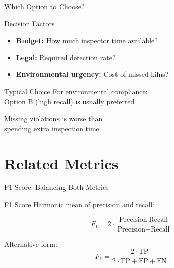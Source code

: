 \documentclass{beamer}
\begin{document}
\begin{frame}{Which Option to Choose?}
\begin{alertblock}{Decision Factors}
\small
\begin{itemize}
    \item \textbf{Budget:} How much inspector time available?
    \item \textbf{Legal:} Required detection rate?
    \item \textbf{Environmental urgency:} Cost of missed kilns?
\end{itemize}
\end{alertblock}

\vspace{0.15cm}

\begin{keypointsbox}{Typical Choice}
\small
For environmental compliance: \\
Option B (high recall) is usually preferred

\vspace{0.2cm}

Missing violations is worse than \\
spending extra inspection time
\end{keypointsbox}
\end{frame}

\section{Related Metrics}

\begin{frame}{F1 Score: Balancing Both Metrics}
\begin{definitionbox}{F1 Score}
\small
Harmonic mean of precision and recall:

$$F_1 = 2 \cdot \frac{\text{Precision} \cdot \text{Recall}}{\text{Precision} + \text{Recall}}$$

\vspace{0.2cm}

Alternative form:
$$F_1 = \frac{2 \cdot \text{TP}}{2 \cdot \text{TP} + \text{FP} + \text{FN}}$$
\end{definitionbox}
\end{frame}
\end{document}
